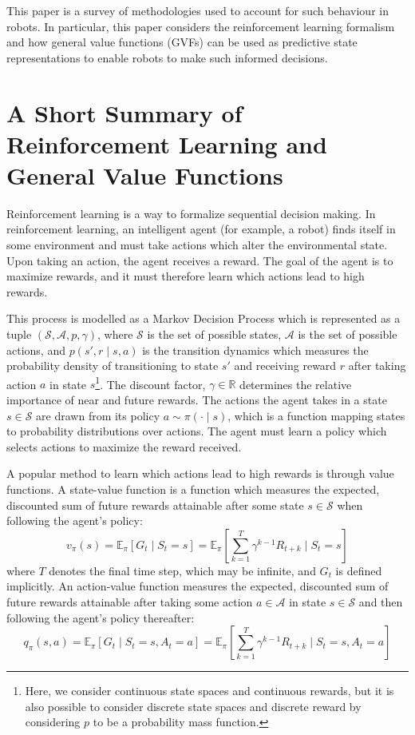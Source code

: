 \documentclass{article} %
\theoremstyle{plain}
\theoremstyle{definition}
\theoremstyle{remark}
\begin{document}
This paper is a survey of methodologies used to account for such behaviour in robots. In particular, this paper
considers the reinforcement learning formalism and how general value functions (GVFs) can be used as predictive state
representations to enable robots to make such informed decisions.

\section{A Short Summary of Reinforcement Learning and General Value Functions}%

Reinforcement learning is a way to formalize sequential decision making. In reinforcement learning, an intelligent agent
(for example, a robot) finds itself in some environment and must take actions which alter the environmental state. Upon
taking an action, the agent receives a reward. The goal of the agent is to maximize rewards, and it must therefore learn
which actions lead to high rewards.

This process is modelled as a Markov Decision Process which is represented as a tuple $(\mathscr{S}, \mathscr{A}, p,
\gamma)$, where $\mathscr{S}$ is the set of possible states, $\mathscr{A}$ is the set of possible actions, and $p(s', r
\mid s, a)$ is the transition dynamics which measures the probability density of transitioning to state $s'$ and
receiving reward $r$ after taking action $a$ in state $s$\footnote{Here, we consider continuous state spaces and
continuous rewards, but it is also possible to consider discrete state spaces and discrete reward by considering $p$
to be a probability mass function.}. The discount factor, $\gamma \in \mathbb{R}$ determines the relative importance of
near and future rewards. The actions the agent takes in a state $s \in \mathscr{S}$ are drawn from its policy $a \sim
\pi(\cdot \mid s)$, which is a function mapping states to probability distributions over actions. The agent must learn a
policy which selects actions to maximize the reward received.

A popular method to learn which actions lead to high rewards is through value functions. A state-value function is a function
which measures the expected, discounted sum of future rewards attainable after some state $s \in \mathscr{S}$ when following the agent's policy:
\begin{equation}
	v_{\pi}(s) = \mathbb{E}_{\pi}\left[G_{t} \mid S_{t} = s \right] = \mathbb{E}_{\pi}\left[ \sum\limits_{k=1}^{T}
	\gamma^{k-1} R_{t + k} \mid S_{t} = s \right]
\end{equation}
where $T$ denotes the final time step, which may be infinite, and $G_{t}$ is defined implicitly. An action-value
function measures the expected, discounted
sum of future rewards attainable after taking some action $a \in \mathscr{A}$ in state $s \in \mathscr{S}$ and then following
the agent's policy thereafter:
\begin{equation}
	q_{\pi}(s, a) = \mathbb{E}_{\pi}\left[G_{t} \mid S_{t} = s, A_{t} = a \right] = \mathbb{E}_{\pi}\left[ \sum\limits_{k=1}^{T}
	\gamma^{k-1} R_{t + k} \mid S_{t} = s, A_{t} = a \right]
\end{equation}
\end{document}
